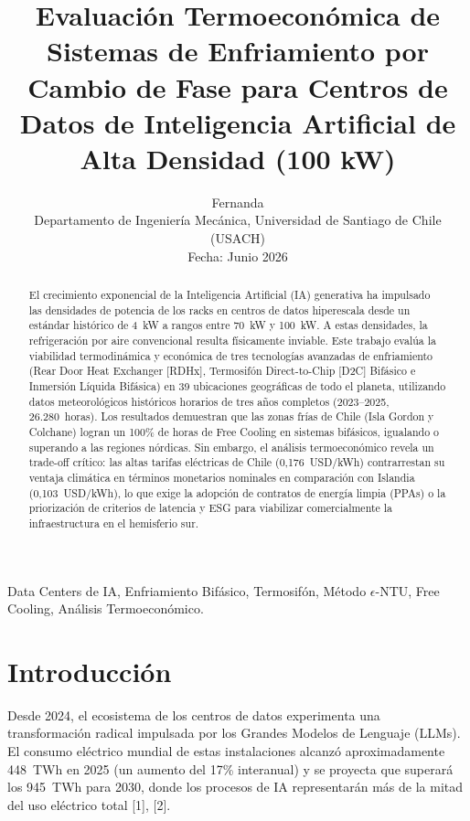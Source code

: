 \documentclass[journal]{IEEEtran}
\begin{document}
\title{Evaluaci\'on Termoecon\'omica de Sistemas de Enfriamiento por Cambio de Fase para Centros de Datos de Inteligencia Artificial de Alta Densidad (100 kW)}

\author{Fernanda\\
\small Departamento de Ingenier\'ia Mec\'anica, Universidad de Santiago de Chile (USACH)\\
Fecha: Junio 2026}

\maketitle

\begin{abstract}
El crecimiento exponencial de la Inteligencia Artificial (IA) generativa ha impulsado las densidades de potencia de los racks en centros de datos hiperescala desde un est\'andar hist\'orico de 4~kW a rangos entre 70~kW y 100~kW. A estas densidades, la refrigeraci\'on por aire convencional resulta f\'isicamente inviable. Este trabajo eval\'ua la viabilidad termodin\'amica y econ\'omica de tres tecnolog\'ias avanzadas de enfriamiento (Rear Door Heat Exchanger [RDHx], Termosif\'on Direct-to-Chip [D2C] Bif\'asico e Inmersi\'on L\'iquida Bif\'asica) en 39 ubicaciones geogr\'aficas de todo el planeta, utilizando datos meteorol\'ogicos hist\'oricos horarios de tres a\~nos completos (2023--2025, 26.280~horas). Los resultados demuestran que las zonas fr\'ias de Chile (Isla Gordon y Colchane) logran un 100\% de horas de Free Cooling en sistemas bif\'asicos, igualando o superando a las regiones n\'ordicas. Sin embargo, el an\'alisis termoecon\'omico revela un trade-off cr\'itico: las altas tarifas el\'ectricas de Chile (0,176~USD/kWh) contrarrestan su ventaja clim\'atica en t\'erminos monetarios nominales en comparaci\'on con Islandia (0,103~USD/kWh), lo que exige la adopci\'on de contratos de energ\'ia limpia (PPAs) o la priorizaci\'on de criterios de latencia y ESG para viabilizar comercialmente la infraestructura en el hemisferio sur.
\end{abstract}

\begin{IEEEkeywords}
Data Centers de IA, Enfriamiento Bif\'asico, Termosif\'on, M\'etodo $\epsilon$-NTU, Free Cooling, An\'alisis Termoecon\'omico.
\end{IEEEkeywords}

\section{Introducci\'on}
Desde 2024, el ecosistema de los centros de datos experimenta una transformaci\'on radical impulsada por los Grandes Modelos de Lenguaje (LLMs). El consumo el\'ectrico mundial de estas instalaciones alcanz\'o aproximadamente 448~TWh en 2025 (un aumento del 17\% interanual) y se proyecta que superar\'a los 945~TWh para 2030, donde los procesos de IA representar\'an m\'as de la mitad del uso el\'ectrico total [1], [2].
\end{document}
